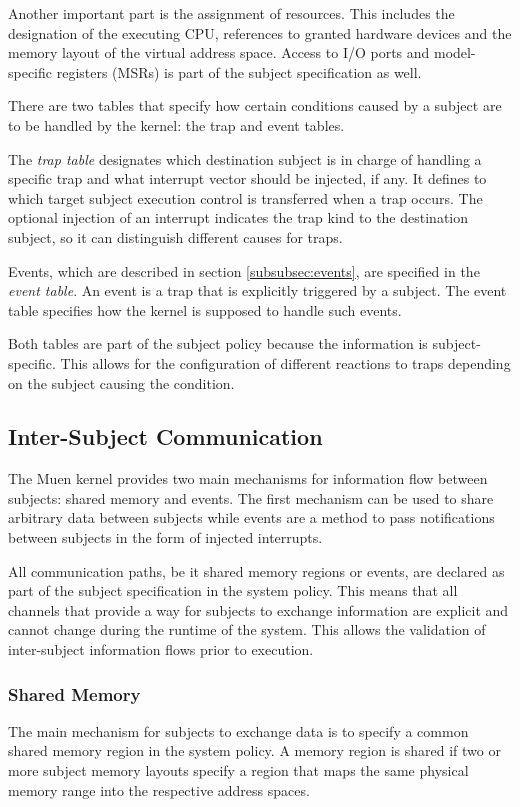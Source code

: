 Another important part is the assignment of resources. This includes the
designation of the executing CPU, references to granted hardware devices and
the memory layout of the virtual address space. Access to I/O ports and
model-specific registers (MSRs) is part of the subject specification
as well.

There are two tables that specify how certain conditions caused by a subject
are to be handled by the kernel: the trap and event tables.

The \emph{trap table} designates which destination subject is
in charge of handling a specific trap and what interrupt vector should be
injected, if any.  It defines to which target subject execution control is
transferred when a trap occurs. The optional injection of an interrupt
indicates the trap kind to the destination subject, so it can distinguish
different causes for traps.

Events, which are described in section \ref{subsubsec:events}, are specified in
the \emph{event table}. An event is a trap that is
explicitly triggered by a subject. The event table specifies how the kernel is
supposed to handle such events.

Both tables are part of the subject policy because the information is
subject-specific. This allows for the configuration of different reactions to
traps depending on the subject causing the condition.

\subsection{Inter-Subject Communication}
The Muen kernel provides two main mechanisms for information flow between
subjects: shared memory and events. The first mechanism can be used to share
arbitrary data between subjects while events are a method to pass notifications
between subjects in the form of injected interrupts.

All communication paths, be it shared memory regions or events, are declared as
part of the subject specification in the system policy. This means that all
channels that provide a way for subjects to exchange information are explicit
and cannot change during the runtime of the system. This allows the validation
of inter-subject information flows prior to execution.

\subsubsection{Shared Memory}
The main mechanism for subjects to exchange data is to specify a common shared
memory region in the system policy. A memory region is shared if two or more
subject memory layouts specify a region that maps the same physical memory range
into the respective address spaces.

